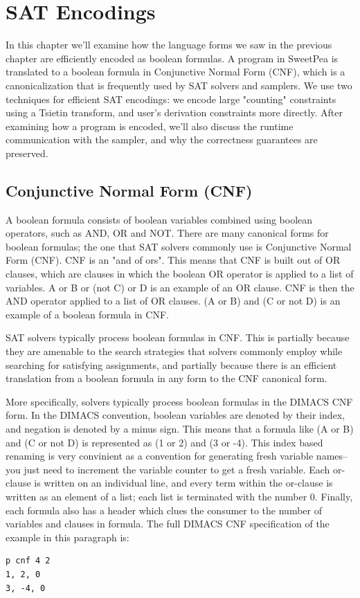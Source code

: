 
\chapter{SAT Encodings}

In this chapter we'll examine how the language forms we saw in the previous chapter are efficiently encoded as boolean formulas. A program in SweetPea is translated to a boolean formula in Conjunctive Normal Form (CNF), which is a canonicalization that is frequently used by SAT solvers and samplers. We use two techniques for efficient SAT encodings: we encode large "counting" constraints using a Tsietin transform, and user's derivation constraints more directly. After examining how a program is encoded, we'll also discuss the runtime communication with the sampler, and why the correctness guarantees are preserved.

\section{Conjunctive Normal Form (CNF)}

A boolean formula consists of boolean variables combined using boolean operators, such as AND, OR and NOT. There are many canonical forms for boolean formulas; the one that SAT solvers commonly use is Conjunctive Normal Form (CNF). CNF is an "and of ors". This means that CNF is built out of OR clauses, which are clauses in which the boolean OR operator is applied to a list of variables. A or B or (not C) or D is an example of an OR clause. CNF is then the AND operator applied to a list of OR clauses. (A or B) and (C or not D) is an example of a boolean formula in CNF.

SAT solvers typically process boolean formulas in CNF. This is partially because they are amenable to the search strategies that solvers commonly employ while searching for satisfying assignments, and partially because there is an efficient translation from a boolean formula in any form to the CNF canonical form.

More specifically, solvers typically process boolean formulas in the DIMACS CNF form. In the DIMACS convention, boolean variables are denoted by their index, and negation is denoted by a minus sign. This means that a formula like (A or B) and (C or not D) is represented as (1 or 2) and (3 or -4). This index based renaming is very convinient as a convention for generating fresh variable names-- you just need to increment the variable counter to get a fresh variable. Each or-clause is written on an individual line, and every term within the or-clause is written as an element of a list; each list is terminated with the number 0. Finally, each formula also has a header which clues the consumer to the number of variables and clauses in formula. The full DIMACS CNF specification of the example in this paragraph is:
\begin{verbatim}
p cnf 4 2
1, 2, 0
3, -4, 0
\end{verbatim}

